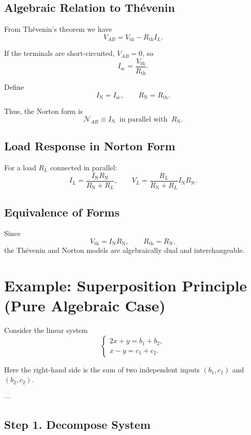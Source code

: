\documentclass[12pt]{article}
\begin{document}
	\subsection*{Algebraic Relation to Thévenin}
	
	From Thévenin’s theorem we have
	$$
	V_{AB} = V_{\text{th}} - R_{\text{th}} I_L.
	$$
	
	If the terminals are short-circuited, $V_{AB} = 0$, so
	$$
	I_{\text{sc}} = \frac{V_{\text{th}}}{R_{\text{th}}}.
	$$
	
	Define
	$$
	I_{\text{N}} = I_{\text{sc}}, 
	\qquad 
	R_{\text{N}} = R_{\text{th}}.
	$$
	
	Thus, the Norton form is
	$$
	\mathcal{N}_{AB} \equiv I_{\text{N}} \;\; \text{in parallel with} \;\; R_{\text{N}}.
	$$
	
	\subsection*{Load Response in Norton Form}
	
	For a load $R_L$ connected in parallel:
	$$
	I_L = \frac{I_{\text{N}} R_{\text{N}}}{R_{\text{N}} + R_L}, 
	\qquad
	V_L = \frac{R_L}{R_{\text{N}} + R_L} I_{\text{N}} R_{\text{N}}.
	$$
	
	\subsection*{Equivalence of Forms}
	
	Since
	$$
	V_{\text{th}} = I_{\text{N}} R_{\text{N}}, \qquad R_{\text{th}} = R_{\text{N}},
	$$
	the Thévenin and Norton models are algebraically dual and interchangeable.
	
	\section*{Example: Superposition Principle (Pure Algebraic Case)}
	
	Consider the linear system
	$$
	\begin{cases}
		2x + y = b_1 + b_2, \\
		x - y = c_1 + c_2.
	\end{cases}
	$$
	
	Here the right-hand side is the sum of two independent inputs 
	$(b_1, c_1)$ and $(b_2, c_2)$.
	
	---
	
	\subsection*{Step 1. Decompose System}
	
\end{document}
